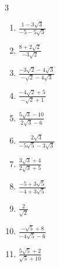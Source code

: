 \begin{multicols}{3}
\begin{enumerate}
\columnbreak %

\resetques

  \item $\displaystyle \frac{1-3\sqrt{3}}{-5-5\sqrt{3}}$


  \item $\displaystyle \frac{8+2\sqrt{2}}{-3\sqrt{2}}$


  \item $\displaystyle \frac{-3\sqrt{2}-4\sqrt{3}}{-\sqrt{2}-4\sqrt{3}}$


  \item $\displaystyle \frac{-4\sqrt{2}+5}{-\sqrt{2}+1}$


  \item $\displaystyle \frac{5\sqrt{3}-10}{2\sqrt{3}-6}$


\columnbreak %

  \item $\displaystyle \frac{2\sqrt{3}}{-5\sqrt{5}-3\sqrt{3}}$


  \item $\displaystyle \frac{3\sqrt{3}+4}{2\sqrt{3}+5}$


  \item $\displaystyle \frac{-5+3\sqrt{5}}{-4+3\sqrt{5}}$


  \item $\displaystyle \frac{2}{\sqrt{2}}$


  \item $\displaystyle \frac{-\sqrt{5}+8}{-4\sqrt{5}-6}$


\columnbreak %

  \item $\displaystyle \frac{5\sqrt{5}+2}{\sqrt{5}+10}$


\end{enumerate}
\end{multicols}
